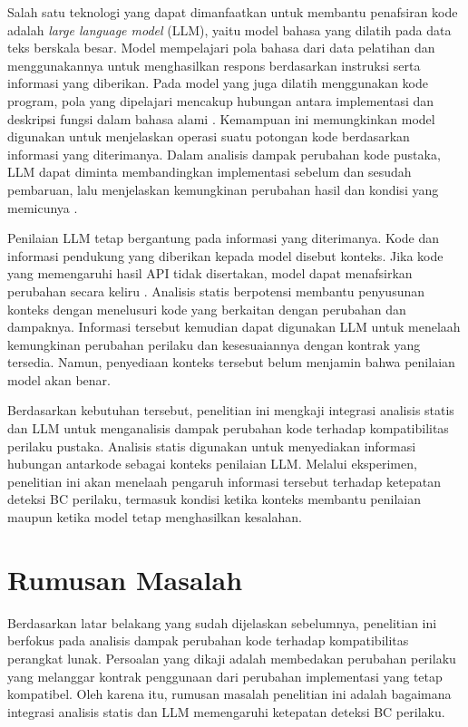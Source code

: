 Salah satu teknologi yang dapat dimanfaatkan untuk membantu penafsiran kode adalah \textit{large language model} (LLM), yaitu model bahasa yang dilatih pada data teks berskala besar. Model mempelajari pola bahasa dari data pelatihan dan menggunakannya untuk menghasilkan respons berdasarkan instruksi serta informasi yang diberikan. Pada model yang juga dilatih menggunakan kode program, pola yang dipelajari mencakup hubungan antara implementasi dan deskripsi fungsi dalam bahasa alami \parencite{Chen2021Code}. Kemampuan ini memungkinkan model digunakan untuk menjelaskan operasi suatu potongan kode berdasarkan informasi yang diterimanya. Dalam analisis dampak perubahan kode pustaka, LLM dapat diminta membandingkan implementasi sebelum dan sesudah pembaruan, lalu menjelaskan kemungkinan perubahan hasil dan kondisi yang memicunya \parencite{Cheng2026BCaLLM}.

Penilaian LLM tetap bergantung pada informasi yang diterimanya. Kode dan informasi pendukung yang diberikan kepada model disebut konteks. Jika kode yang memengaruhi hasil API tidak disertakan, model dapat menafsirkan perubahan secara keliru \parencite{Cheng2026BCaLLM}. Analisis statis berpotensi membantu penyusunan konteks dengan menelusuri kode yang berkaitan dengan perubahan dan dampaknya. Informasi tersebut kemudian dapat digunakan LLM untuk menelaah kemungkinan perubahan perilaku dan kesesuaiannya dengan kontrak yang tersedia. Namun, penyediaan konteks tersebut belum menjamin bahwa penilaian model akan benar.

Berdasarkan kebutuhan tersebut, penelitian ini mengkaji integrasi analisis statis dan LLM untuk menganalisis dampak perubahan kode terhadap kompatibilitas perilaku pustaka. Analisis statis digunakan untuk menyediakan informasi hubungan antarkode sebagai konteks penilaian LLM\@. Melalui eksperimen, penelitian ini akan menelaah pengaruh informasi tersebut terhadap ketepatan deteksi BC perilaku, termasuk kondisi ketika konteks membantu penilaian maupun ketika model tetap menghasilkan kesalahan.

\section{Rumusan Masalah}
\label{sec:rumusan-masalah}

Berdasarkan latar belakang yang sudah dijelaskan sebelumnya, penelitian ini berfokus pada analisis dampak perubahan kode terhadap kompatibilitas perangkat lunak. Persoalan yang dikaji adalah membedakan perubahan perilaku yang melanggar kontrak penggunaan dari perubahan implementasi yang tetap kompatibel. Oleh karena itu, rumusan masalah penelitian ini adalah bagaimana integrasi analisis statis dan LLM memengaruhi ketepatan deteksi BC perilaku.

